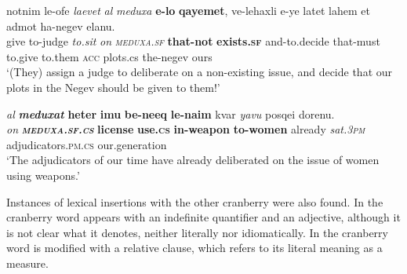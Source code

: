 \documentclass[output=paper]{langsci/langscibook}
\begin{document}
        \ea\label{she:meduxa-rc-insertion}
            \gll notnim le-{\shin}ofe{\tet} \textit{la{\shin}evet} \textit{{\ayin}al} \textit{meduxa} \textbf{{\shinB}e-lo} \textbf{qayemet}, ve-lehaxli{\tet} {\shin}e-ye{\shin} latet lahem {\alef}et {\alef}admot ha-negev {\shin}elanu.\\
                give to-judge \textit{to.sit} \textit{on} \textit{\textsc{meduxa}.\textsc{sf}} \textbf{that-not} \textbf{exists.\textsc{sf}} and-to.decide that-must to.give to.them \textsc{acc} plots.cs the-negev ours\\
            \glt `(They) assign a judge to deliberate on a non-existing issue, and decide that our plots in the Negev should be given to them!'
        \z

    \ea\label{she:meduxa-cs-insertion}
        \gll \textit{{\ayin}al} \textit{\textbf{meduxat}} \textbf{heter} \textbf{{\shinB}imu{\shinB}} \textbf{be-ne{\shinB}eq} \textbf{le-na{\shinB}im} kvar \textit{ya{\shin}vu} posqei dorenu.\\
            \textit{on} \textit{\textbf{\textsc{meduxa}.\textsc{sf}.\textsc{cs}}} \textbf{license} \textbf{use.\textsc{cs}} \textbf{in-weapon} \textbf{to-women} already \textit{sat.\textsc{3pm}} adjudicators.\textsc{pm}.\textsc{cs} our.generation \\
        \glt `The adjudicators of our time have already deliberated on the issue of women using weapons.'
    \z

Instances of lexical insertions with the other cranberry  were also found. In  the cranberry word  appears with an indefinite quantifier and an adjective, although it is not clear what it denotes, neither literally nor idiomatically. In  the cranberry word  is modified with a relative clause, which refers to its literal meaning as a measure.
\end{document}
